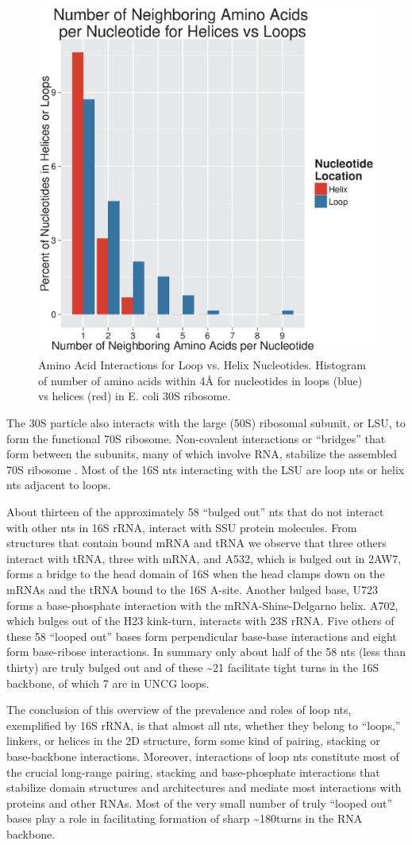 \begin{figure}
  \includegraphics[width=0.5\linewidth]{chapter-1/figs/aa-loop-v-nt}
  \caption{Amino Acid Interactions for Loop vs. Helix Nucleotides. Histogram of
    number of amino acids within 4Å for nucleotides in loops (blue) vs helices
  (red) in E. coli 30S ribosome. }
  \label{fig:aa-loop-v-nt}
\end{figure}

The 30S particle also interacts with the large (50S) ribosomal subunit, or LSU,
to form the functional 70S ribosome. Non-covalent interactions or ``bridges''
that form between the subunits, many of which involve RNA, stabilize the
assembled 70S ribosome \cite{Yusupov2001}. Most of the 16S nts interacting with
the LSU are loop nts or helix nts adjacent to loops. 

About thirteen of the approximately 58 ``bulged out'' nts that do not interact
with other nts in \EC{} 16S rRNA, interact with SSU protein molecules. From
structures that contain bound mRNA and tRNA we observe that three others
interact with tRNA, three with mRNA, and A532, which is bulged out in 2AW7,
forms a bridge to the head domain of 16S when the head clamps down on the mRNAs
and the tRNA bound to the 16S A-site. Another bulged base, U723 forms a
base-phosphate interaction with the mRNA-Shine-Delgarno helix. A702, which
bulges out of the H23 kink-turn, interacts with 23S rRNA. Five others of these
58 ``looped out'' bases form perpendicular base-base interactions and eight form
base-ribose interactions. In summary only about half of the 58 nts (less than
thirty) are truly bulged out and of these \textasciitilde 21 facilitate tight turns in the 16S
backbone, of which 7 are in UNCG loops. 

The conclusion of this overview of the prevalence and roles of loop nts,
exemplified by 16S rRNA, is that almost all nts, whether they belong to ``loops,''
linkers, or helices in the 2D structure, form some kind of pairing, stacking or
base-backbone interactions. Moreover, interactions of loop nts constitute most
of the crucial long-range pairing, stacking and base-phosphate interactions that
stabilize domain structures and architectures and mediate most interactions with
proteins and other RNAs. Most of the very small number of truly “looped out”
bases play a role in facilitating formation of sharp \textasciitilde 180\degree turns in the RNA
backbone. 

